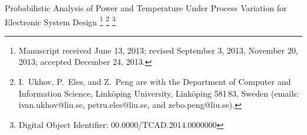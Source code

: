 {\TitleFont Probabilistic Analysis of Power and Temperature Under Process Variation for Electronic System Design}%
\thanks{Manuscript received June 13, 2013; revised September 3, 2013, November 20, 2013; accepted December 24, 2013.}%
\thanks{I.~Ukhov, P.~Eles, and Z.~Peng are with the Department of Computer and Information Science, Link\"{o}ping University, Link\"{o}ping 581\,83, Sweden (emails: ivan.ukhov@liu.se, petru.eles@liu.se, and zebo.peng@liu.se).}%
\thanks{Digital Object Identifier: 00.0000/TCAD.2014.0000000}
